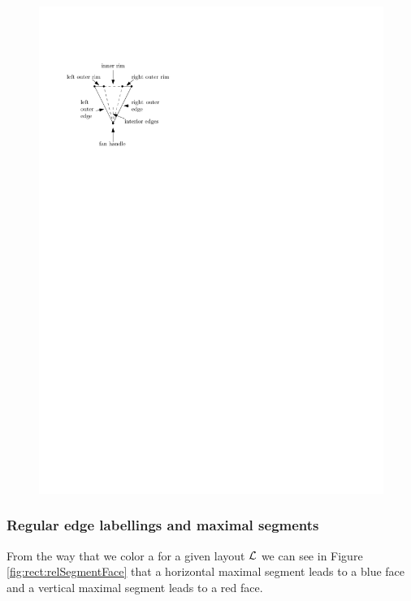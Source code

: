    \begin{figure}[h]
     \centering
     \includegraphics[scale=1]{rectangularDuals/img/fanterms}
     \caption{}
     \label{fig:rect:fanTerms}
   \end{figure}

  \subsubsection{Regular edge labellings and maximal segments}
    From the way that we color a \rel for a given layout $\mathcal{L}$ we can see in Figure \ref{fig:rect:relSegmentFace} that a horizontal maximal segment leads to a blue face and a vertical maximal segment leads to a red face.

